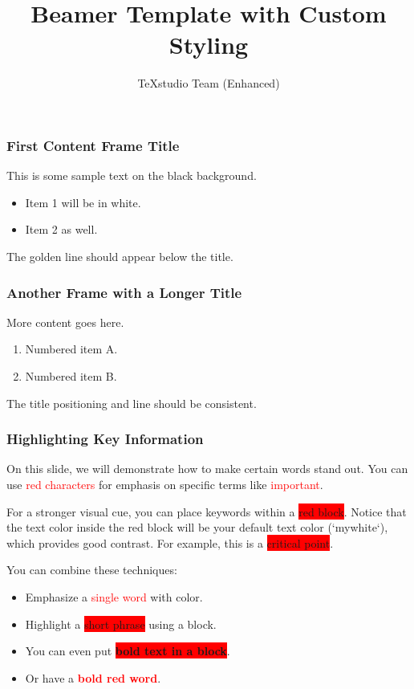 \documentclass[12pt,notes]{beamer} %
\title{Beamer Template with Custom Styling}
\author{TeXstudio Team (Enhanced)}
\date{} %
\begin{document}
	
	\begin{frame}[plain]
		\maketitle 
	\end{frame}
	
	\begin{frame}
		\frametitle{First Content Frame Title}
		This is some sample text on the black background.
		\begin{itemize}
			\item Item 1 will be in white.
			\item Item 2 as well.
		\end{itemize}
		The golden line should appear below the title.
	\end{frame}
	
	\begin{frame}
		\frametitle{Another Frame with a Longer Title}
		More content goes here.
		\begin{enumerate}
			\item Numbered item A.
			\item Numbered item B.
		\end{enumerate}
		The title positioning and line should be consistent.
	\end{frame}
	
	\begin{frame}
		\frametitle{Highlighting Key Information} %
		
		On this slide, we will demonstrate how to make certain words stand out.
		You can use \textcolor{red}{red characters} for emphasis on specific terms like \textcolor{red}{important}.
		
		For a stronger visual cue, you can place keywords within a \colorbox{red}{red block}.
		Notice that the text color inside the red block will be your default text color (`mywhite`), which provides good contrast. For example, this is a \colorbox{red}{critical point}.
		
		You can combine these techniques:
		\begin{itemize}
			\item Emphasize a \textcolor{red}{single word} with color.
			\item Highlight a \colorbox{red}{short phrase} using a block.
			\item You can even put \textbf{\colorbox{red}{bold text in a block}}.
			\item Or have a \textcolor{red}{\textbf{bold red word}}.
		\end{itemize}
		
		
	\end{frame}
	
\end{document}
